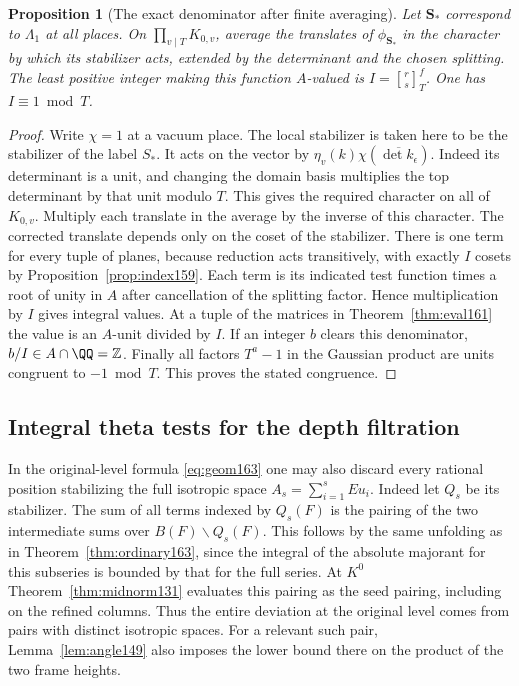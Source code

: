 \documentclass[a4paper,11pt]{article}
\newtheorem{proposition}{Proposition}[section]
\theoremstyle{definition}
\theoremstyle{remark}
\newcommand{\ZZ}{\mathbb Z}\newcommand{\ord}{\operatorname{ord}}
\numberwithin{equation}{section}
\begin{document}
\begin{proposition}[The exact denominator after finite averaging]
\label{prop:exact161}
Let \(\boldsymbol S_*\) correspond to \(\Lambda_1\) at all places.
On \(\prod_{v\mid T}K_{0,v}\), average the translates of
\(\phi_{\boldsymbol S_*}\) in the character by which its
stabilizer acts, extended by the determinant and the chosen
splitting. The least positive integer making this function
\(A\)-valued is \(I={r\brack s}_T^f\). One has \(I\equiv1\bmod T\).
\end{proposition}
\begin{proof}
Write \(\chi=1\) at a vacuum place. The local stabilizer is
taken here to be the stabilizer of the label \(S_*\). It acts on
the vector by \(\eta_v(k)\chi(\overline{\det k_\epsilon})\).
Indeed its determinant is a unit, and changing the domain
basis multiplies the top determinant by that unit modulo
\(T\). This gives the required character on all of \(K_{0,v}\).
Multiply each translate in the average by the inverse of this
character. The corrected translate depends only on the coset
of the stabilizer. There is one term for every tuple of planes,
because reduction acts transitively, with exactly \(I\) cosets
by Proposition~\ref{prop:index159}. Each term is its indicated
test function times a root of unity in \(A\) after cancellation
of the splitting factor. Hence multiplication by \(I\) gives integral
values. At a tuple of the matrices in Theorem~\ref{thm:eval161}
the value is an \(A\)-unit divided by \(I\). If an integer \(b\)
clears this denominator, \(b/I\in A\cap\QQ=\ZZ\). Finally all
factors \(T^a-1\) in the Gaussian product are units congruent
to \(-1\bmod T\). This proves the stated congruence.
\end{proof}

\subsection{Integral theta tests for the depth filtration}\label{nav:VII-13}
\label{sec:integraldepth165}

In the original-level formula \eqref{eq:geom163} one may also
discard every rational position stabilizing the full isotropic
space \(A_s=\sum_{i=1}^s Eu_i\). Indeed let \(Q_s\) be its
stabilizer. The sum of all terms indexed by \(Q_s(F)\) is the
pairing of the two intermediate sums over \(B(F)\backslash
Q_s(F)\). This follows by the same unfolding as in
Theorem~\ref{thm:ordinary163}, since the integral of the
absolute majorant for this subseries is bounded by that for
the full series. At \(K^0\) Theorem~\ref{thm:midnorm131}
evaluates this pairing as the seed pairing, including on the
refined columns. Thus the entire deviation at the original
level comes from pairs with distinct isotropic spaces. For a
relevant such pair, Lemma~\ref{lem:angle149} also imposes
the lower bound there on the product of the two frame heights.
\end{document}
